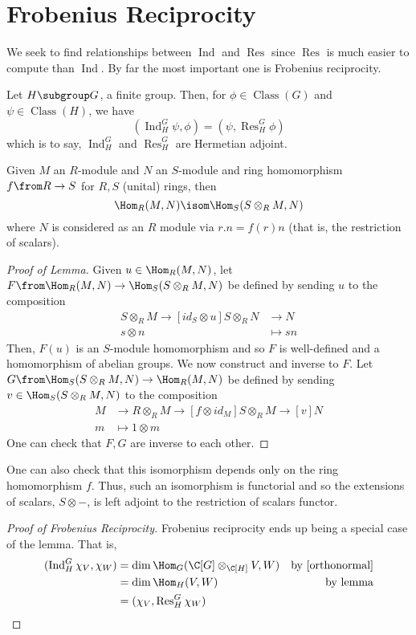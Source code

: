 \documentclass[11pt,leqno,oneside]{amsbook}
\newcommand{\Class}{\operatorname{Class}}
\newcommand{\Res}{\operatorname{Res}}
\newcommand{\Ind}{\operatorname{Ind}}
\numberwithin{thm}{section}
\begin{document}
\section{Frobenius Reciprocity}
We seek to find relationships between \(\Ind\) and \(\Res\) since
\(\Res\) is much easier to compute than \(\Ind\). By far the most
important one is Frobenius reciprocity.
\begin{thm}
  Let \(H \subgroup G\), a finite group. Then, for \(\phi \in
  \Class(G)\) and \(\psi \in \Class(H)\), we have \[
    (\Ind_H^G \psi, \phi) = (\psi, \Res_H^G \phi)
  \]
  which is to say, \(\Ind_H^G\) and \(\Res_H^G\) are Hermetian adjoint.
\end{thm}
\begin{lem}
  Given \(M\) an \(R\)-module and \(N\) an \(S\)-module and ring
  homomorphism \(f \from R \to S\) for \(R,S\) (unital) rings, then \[
    \Hom_{R}(M,N) \isom \Hom_{S}(S \otimes_{R} M, N)
  \]
  where \(N\) is considered as an \(R\) module via \(r.n = f(r)n\)
  (that is, the restriction of scalars).
\end{lem}
\begin{proof}[Proof of Lemma]
  Given \(u \in \Hom_R(M,N)\), let \(F \from \Hom_R(M,N) \to \Hom_S(S
  \otimes_R M,N)\) be defined by sending \(u\) to the composition
  \begin{align*}
    S \otimes_R M \to[id_S \otimes u] S \otimes_R N & \to N \\
    s \otimes n &\mapsto sn
  \end{align*}
  Then, \(F(u)\) is an \(S\)-module homomorphism and so \(F\) is
  well-defined and a homomorphism of abelian groups. We now construct
  and inverse to \(F\). Let \(G \from \Hom_S(S \otimes_R M, N) \to
  \Hom_R(M,N)\) be defined by sending \(v \in \Hom_S(S \otimes_R M,
  N)\) to the composition
  \begin{align*}
    M & \to R \otimes_R M \to[f \otimes id_M] S \otimes_R M \to[v] N
    \\
    m & \mapsto 1 \otimes m
  \end{align*}
  One can check that \(F,G\) are inverse to each other.
\end{proof}
\begin{rmk}
  One can also check that this isomorphism depends only on the ring homomorphism
  \(f\). Thus, such an isomorphism is functorial and so the extensions
  of scalars, \(S \otimes -\), is left adjoint to the restriction of
  scalars functor.
\end{rmk}
\begin{proof}[Proof of Frobenius Reciprocity]
  Frobenius reciprocity ends up being a special case of the
  lemma. That is,
  \begin{align*}
    (\Ind_H^G \chi_V, \chi_W)
    & = \dim \Hom_G(\C[G] \otimes_{\C[H]} V,
      W) & \text{by }\ref{orthonormal}\\
    & = \dim \Hom_H(V,W) & \text{by lemma} \\
    & = (\chi_V, \Res_H^G \chi_W)
  \end{align*}
\end{proof}
\end{document}
